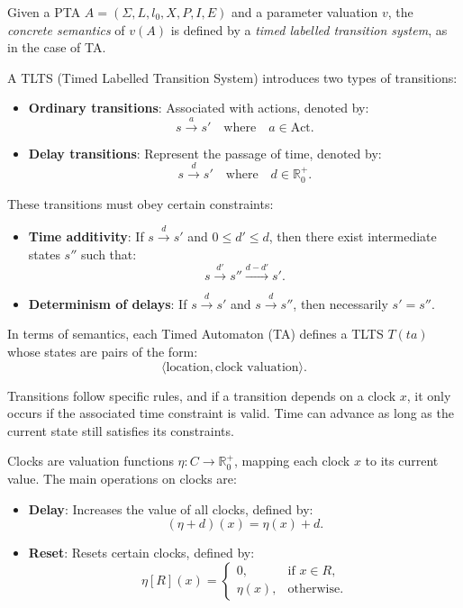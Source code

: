 Given a PTA $A = (\Sigma, L, l_0, X, P, I, E)$ and a parameter valuation $v$, the \emph{concrete semantics} of $v(A)$ is defined by a \emph{timed labelled transition system}, as in the case of TA.


A TLTS (Timed Labelled Transition System) introduces two types of transitions:

\begin{itemize}
    \item \textbf{Ordinary transitions}: Associated with actions, denoted by:
    \[
        s \xrightarrow{a} s' \quad \text{where} \quad a \in \text{Act}.
    \]
    \item \textbf{Delay transitions}: Represent the passage of time, denoted by:
    \[
        s \xrightarrow{d} s' \quad \text{where} \quad d \in \mathbb{R}^+_0.
    \]
\end{itemize}

These transitions must obey certain constraints:

\begin{itemize}
    \item \textbf{Time additivity}: If \( s \xrightarrow{d} s' \) and \( 0 \leq d' \leq d \), then there exist intermediate states \( s'' \) such that:
    \[
        s \xrightarrow{d'} s'' \xrightarrow{d - d'} s'.
    \]
    \item \textbf{Determinism of delays}: If \( s \xrightarrow{d} s' \) and \( s \xrightarrow{d} s'' \), then necessarily \( s' = s'' \).
\end{itemize}

In terms of semantics, each Timed Automaton (TA) defines a TLTS \( T(ta) \) whose states are pairs of the form:
\[
    \langle \text{location}, \text{clock valuation} \rangle.
\]

Transitions follow specific rules, and if a transition depends on a clock \( x \), it only occurs if the associated time constraint is valid. Time can advance as long as the current state still satisfies its constraints.

Clocks are valuation functions \( \eta: C \to \mathbb{R}^+_0 \), mapping each clock \( x \) to its current value. The main operations on clocks are:

\begin{itemize}
    \item \textbf{Delay}: Increases the value of all clocks, defined by:
    \[
        (\eta + d)(x) = \eta(x) + d.
    \]
    \item \textbf{Reset}: Resets certain clocks, defined by:
    \[
        \eta[R](x) = 
        \begin{cases}
            0, & \text{if } x \in R, \\
            \eta(x), & \text{otherwise}.
        \end{cases}
    \]
\end{itemize}

